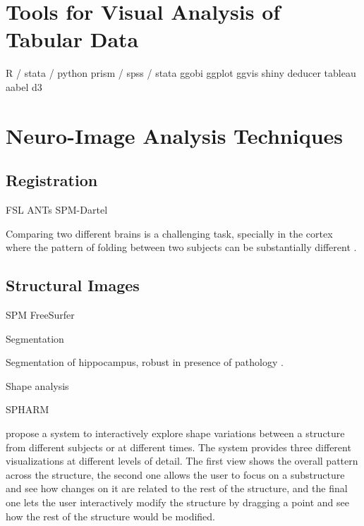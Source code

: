 \section{Tools for Visual Analysis of Tabular Data}

R  / stata  / python
prism / spss / stata
ggobi
ggplot \autocite{wickham_practical_2008}
ggvis
shiny
deducer
tableau
aabel
d3

\begin{table}
	\centering
		\begin{tabular}
			
		\end{tabular}
	\label{tab_related_tabular_applications}
\end{table}

\section{Neuro-Image Analysis Techniques}

\subsection{Registration}

FSL
ANTs
SPM-Dartel


Comparing two different brains is a challenging task, specially in the cortex where the pattern of folding between two subjects can be substantially different \autocite{toga_new_2002}.

\subsection{Structural Images}

SPM
FreeSurfer

Segmentation

Segmentation of hippocampus, robust in presence of pathology \autocite{kim_robust_2011}.

Shape analysis

SPHARM

\autocite{hermann_visual_2014} propose a system to interactively explore shape variations between a structure from different subjects or at different times. The system provides three different visualizations at different levels of detail. The first view shows the overall pattern across the structure, the second one allows the user to focus on a substructure and see how changes on it are related to the rest of the structure, and the final one lets the user interactively modify the structure by dragging a  point and see how the rest of the structure would be modified. 

